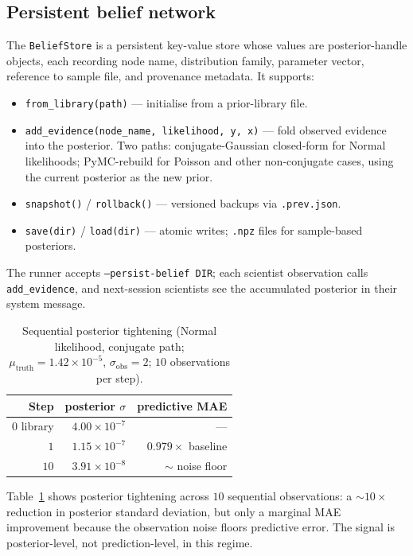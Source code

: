 \documentclass{article}
\begin{document}
\subsection{Persistent belief network}
\label{sec:belief-store}

The \texttt{BeliefStore} is a persistent key-value store whose
values are posterior-handle objects, each recording node name,
distribution family, parameter vector, reference to sample file, and
provenance metadata. It supports:

\begin{itemize}[leftmargin=*, itemsep=0pt]
\item \texttt{from\_library(path)} --- initialise from a prior-library
  file.
\item \texttt{add\_evidence(node\_name, likelihood, y, x)} --- fold
  observed evidence into the posterior. Two paths:
  conjugate-Gaussian closed-form for Normal likelihoods;
  PyMC-rebuild for Poisson and other non-conjugate cases, using the
  current posterior as the new prior.
\item \texttt{snapshot()} / \texttt{rollback()} --- versioned backups
  via \texttt{.prev.json}.
\item \texttt{save(dir)} / \texttt{load(dir)} --- atomic writes;
  \texttt{.npz} files for sample-based posteriors.
\end{itemize}

The runner accepts \texttt{--persist-belief DIR}; each scientist
observation calls \texttt{add\_evidence}, and next-session
scientists see the accumulated posterior in their system message.

\begin{table}[h]
\centering
\caption{Sequential posterior tightening (Normal likelihood, conjugate
path; $\mu_{\mathrm{truth}} = 1.42 \times 10^{-5}$,
$\sigma_{\mathrm{obs}} = 2$; $10$ observations per step).}
\label{tab:persist}
\begin{tabular}{rrr}
\toprule
Step         & posterior $\sigma$ & predictive MAE \\
\midrule
$0$ library  & $4.00 \times 10^{-7}$ & --- \\
$1$          & $1.15 \times 10^{-7}$ & $0.979 \times$ baseline \\
$10$         & $3.91 \times 10^{-8}$ & $\sim$ noise floor \\
\bottomrule
\end{tabular}
\end{table}

Table~\ref{tab:persist} shows posterior tightening across $10$
sequential observations: a $\sim 10 \times$ reduction in posterior
standard deviation, but only a marginal MAE improvement because the
observation noise floors predictive error. The signal is
posterior-level, not prediction-level, in this regime.
\end{document}
